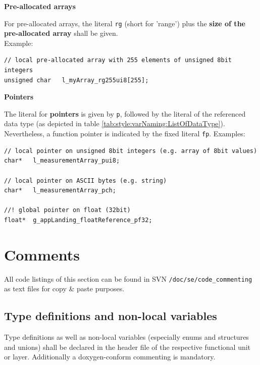 \textbf{Pre-allocated arrays}

For pre-allocated arrays, the literal \texttt{rg} (short for 'range') plus the \textbf{size of the pre-allocated array} shall be given.\\
Example:
\begin{lstlisting}
// local pre-allocated array with 255 elements of unsigned 8bit integers
unsigned char	l_myArray_rg255ui8[255];
\end{lstlisting}

\textbf{Pointers}

The literal for \textbf{pointers} is given by \texttt{p}, followed by the literal of the referenced data type (as depicted in table \ref{tab:style:varNaming:ListOfDataType}). Nevertheless, a function pointer is indicated by the fixed literal \texttt{fp}.
Examples:
\begin{lstlisting}
// local pointer on unsigned 8bit integers (e.g. array of 8bit values)
char* 	l_measurementArray_pui8;

// local pointer on ASCII bytes (e.g. string)
char* 	l_measurementArray_pch;

//! global pointer on float (32bit)
float* 	g_appLanding_floatReference_pf32;
\end{lstlisting}


\newpage
\section{Comments}
\label{sec:style:comments}

All code listings of this section can be found in SVN \texttt{/doc/se/code\_commenting} as text files for copy \& paste purposes.

\subsection{Type definitions and non-local variables}
\label{sec:style:comments:typedef}
Type definitions as well as non-local variables (especially enums and structures and unions) shall be declared in the header file of the respective functional unit or layer. Additionally a doxygen-conform commenting is mandatory.

